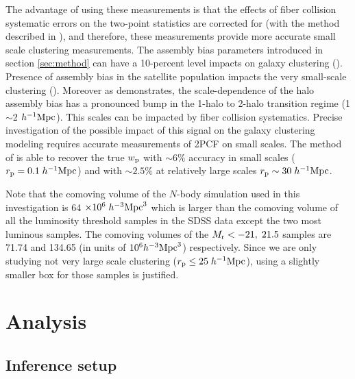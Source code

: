 The advantage of using these measurements is that the effects of fiber collision systematic errors on the two-point statistics are corrected for (with the method described in \citealt{guo2012}), and therefore, these measurements provide more accurate small scale clustering measurements. The assembly bias parameters introduced in section \ref{sec:method} can have a 10-percent level impacts on galaxy clustering (\citealt{decorated}). Presence of assembly bias in the satellite population impacts the very small-scale clustering (\citealt{decorated}). Moreover as \citealt{sunayama2016} demonstrates, the scale-dependence of the halo assembly bias has a pronounced bump in the 1-halo to 2-halo transition regime (1$\sim$2 $h^{-1}\rm{Mpc}$). This scales can be impacted by fiber collision systematics. Precise investigation of the possible impact of this signal on the galaxy clustering modeling requires accurate measurements of 2PCF on small scales. 
The method of \citealt{guo2012} is able to recover the true $w_{\rm p}$ with  $\sim 6\%$ accuracy in small scales ($r_{\rm{p}} = 0.1 \; h^{-1}\rm{Mpc}$) and with $\sim 2.5\%$ at relatively large scales $r_{\rm{p}} \sim 30 \; h^{-1}\rm{Mpc}$. 

Note that the comoving volume of the $N$-body simulation used in this investigation is 64 $\times 10^{6} \; h^{-3}\rm{Mpc}^{3}$ which is larger than the comoving volume of all the luminosity threshold samples in the SDSS data except the two most luminous samples. The comoving volumes of the $M_{\rm r}<-21, \; 21.5$ samples are 71.74 and 134.65 (in units of $10^{6} h^{-3}\rm{Mpc}^{3}$) respectively. Since we are only studying not very large scale clustering ($r_{\rm p} \leq 25 \; h^{-1}\rm{Mpc}$), using a slightly smaller box for those samples is justified. 

\section{Analysis}\label{sec:analysis}

\subsection{Inference setup}\label{subsec:analysis}

